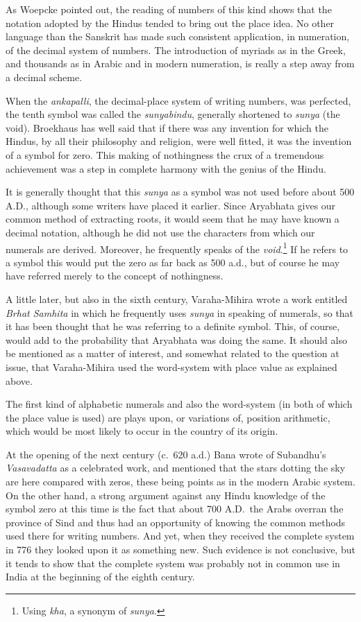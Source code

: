 \documentclass[11pt,a4paper]{article}
\begin{document}
As Woepcke pointed out, the reading of numbers of this kind shows that the notation adopted by the Hindus tended to bring out the place idea. No other language than the Sanskrit has made such consistent application, in numeration, of the decimal system of numbers. The introduction of myriads as in the Greek, and thousands as in Arabic and in modern numeration, is really a step away from a decimal scheme.

When the \textit{ankapalli}, the decimal-place system of writing numbers, was perfected, the tenth symbol was called the \textit{sunyabindu}, generally shortened to \textit{sunya} (the void). Broekhaus has well said that if there was any invention for which the Hindus, by all their philosophy and religion, were well fitted, it was the invention of a symbol for zero. This making of nothingness the crux of a tremendous achievement was a step in complete harmony with the genius of the Hindu.

It is generally thought that this \textit{sunya} as a symbol was not used before about 500 A.D., although some writers have placed it earlier. Since Aryabhata gives our common method of extracting roots, it would seem that he may have known a decimal notation, although he did not use the characters from which our numerals are derived. Moreover, he frequently speaks of the \textit{void}.\footnote{Using \textit{kha}, a synonym of \textit{sunya}.} If he refers to a symbol this would put the zero as far back as 500 a.d., but of course he may have referred merely to the concept of nothingness.

A little later, but also in the sixth century, Varaha-Mihira wrote a work entitled \textit{Brhat Samhita} in which he frequently uses \textit{sunya} in speaking of numerals, so that it has been thought that he was referring to a definite symbol. This, of course, would add to the probability that Aryabhata was doing the same. It should also be mentioned as a matter of interest, and somewhat related to the question at issue, that Varaha-Mihira used the word-system with place value as explained above.

The first kind of alphabetic numerals and also the word-system (in both of which the place value is used) are plays upon, or variations of, position arithmetic, which would be most likely to occur in the country of its origin.

At the opening of the next century (c.~620 a.d.) Bana wrote of Subandhu's \textit{Vasavadatta} as a celebrated work, and mentioned that the stars dotting the sky are here compared with zeros, these being points as in the modern Arabic system. On the other hand, a strong argument against any Hindu knowledge of the symbol zero at this time is the fact that about 700 A.D.\ the Arabs overran the province of Sind and thus had an opportunity of knowing the common methods used there for writing numbers. And yet, when they received the complete system in 776 they looked upon it as something new. Such evidence is not conclusive, but it tends to show that the complete system was probably not in common use in India at the beginning of the eighth century.
\end{document}
